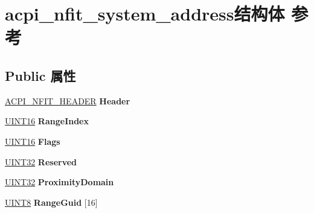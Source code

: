 \hypertarget{structacpi__nfit__system__address}{}\section{acpi\+\_\+nfit\+\_\+system\+\_\+address结构体 参考}
\label{structacpi__nfit__system__address}
\subsection*{Public 属性}
\begin{DoxyCompactItemize}
\item 
\mbox{\label{structacpi__nfit__system__address_ab4569f81effd1a7dc9a4b32599c7ccf5}} 
\hyperlink{structacpi__nfit__header}{A\+C\+P\+I\+\_\+\+N\+F\+I\+T\+\_\+\+H\+E\+A\+D\+ER} {\bfseries Header}
\item 
\mbox{\label{structacpi__nfit__system__address_a14ba9f4b4ce89cf12e60696b196b92f3}} 
\hyperlink{_processor_bind_8h_a09f1a1fb2293e33483cc8d44aefb1eb1}{U\+I\+N\+T16} {\bfseries Range\+Index}
\item 
\mbox{\label{structacpi__nfit__system__address_a8ca7cf23e4ae0b59d96aa1f0e7ca191b}} 
\hyperlink{_processor_bind_8h_a09f1a1fb2293e33483cc8d44aefb1eb1}{U\+I\+N\+T16} {\bfseries Flags}
\item 
\mbox{\label{structacpi__nfit__system__address_acf83502033b4dab1c94453eb4c63fe7f}} 
\hyperlink{_processor_bind_8h_ae1e6edbbc26d6fbc71a90190d0266018}{U\+I\+N\+T32} {\bfseries Reserved}
\item 
\mbox{\label{structacpi__nfit__system__address_a507f2769e996b38de196cab1fa9baf9a}} 
\hyperlink{_processor_bind_8h_ae1e6edbbc26d6fbc71a90190d0266018}{U\+I\+N\+T32} {\bfseries Proximity\+Domain}
\item 
\mbox{\label{structacpi__nfit__system__address_a14aed01fca7079aaea0aead815f7b101}} 
\hyperlink{_processor_bind_8h_ab27e9918b538ce9d8ca692479b375b6a}{U\+I\+N\+T8} {\bfseries Range\+Guid} \mbox{[}16\mbox{]}
\item 

\end{DoxyCompactItemize}
